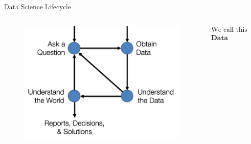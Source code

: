 \documentclass[aspectratio=169]{../latex_main/tntbeamer}  %
\begin{document}
	\begin{frame}[c]{Data Science Lifecycle}
	    \begin{columns}
	        \begin{column}{.4\textwidth}
	        \begin{figure}
	            \includegraphics[scale=.6]{Bild1}
	        \end{figure}
	        \end{column}
	            
	        \begin{column}{.4\textwidth}
	        \bigskip
	        \bigskip
	        \bigskip
	        \bigskip
	            \centering
	            \begin{align*}
	                \text{We call this the} \\
	                \textbf{Data Science Lifecycle}
	            \end{align*}
	            
	        \end{column}

	    \end{columns}
	\end{frame}
	
\end{document}
